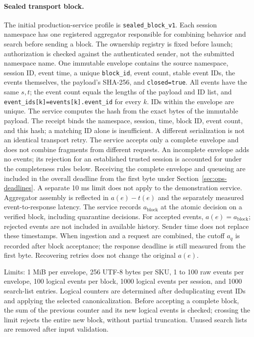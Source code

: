 \documentclass[12pt,a4paper]{article}
\newcommand{\code}[1]{{\ttfamily\small\nolinkurl{#1}}}
\theoremstyle{plainru}
\begin{document}
\paragraph{Sealed transport block.}\label{sec:ops-transport-block}
The initial production-service profile is \code{sealed_block_v1}.
Each session namespace has one registered
aggregator responsible for combining behavior and search before sending a block.
The ownership registry is fixed before launch; authorization is checked against
the authenticated sender, not the submitted namespace name.
One immutable envelope contains the source namespace, session ID,
event time, a unique \code{block_id}, event count, stable event
IDs, the events themselves, the payload's SHA-256, and \code{closed=true}.
All events have the same $s,t$; the event count equals the lengths of the payload
and ID list, and \code{event_ids[k]=events[k].event_id} for every $k$.
IDs within the envelope are unique. The service computes the hash from the exact bytes of the immutable
payload. The receipt binds the namespace, session, time, block ID,
event count, and this hash; a matching ID alone is insufficient.
A different serialization is not an identical transport retry.
The service accepts only a complete envelope and does not combine fragments
from different requests. An incomplete envelope adds no events;
its rejection for an established trusted session is accounted for
under the completeness rules below.
Receiving the complete envelope and queueing are included in the overall deadline from the first
byte under Section~\ref{sec:ops-deadlines}. A separate 10 ms limit
does not apply to the demonstration service. Aggregator assembly is reflected
in $a(e)-t(e)$ and the separately measured event-to-response latency.
The service records $a_{\mathrm{block}}$ at the atomic decision on a verified
block, including quarantine decisions. For accepted events, $a(e)=a_{\mathrm{block}}$;
rejected events are not included in available history.
Sender time does not replace these timestamps.
When ingestion and a request are combined, the cutoff $a_q$
is recorded after block acceptance; the response deadline is still measured
from the first byte. Recovering retries does not change the original $a(e)$.

Limits: 1 MiB per envelope, 256 UTF-8 bytes per SKU,
1 to 100 raw events per envelope, 100 logical events per block,
1000 logical events per session, and 1000 search-list entries.
Logical counters are determined after deduplicating event IDs
and applying the selected canonicalization. Before accepting a complete block,
the sum of the previous counter and its new logical events is checked; crossing
the limit rejects the entire new block, without partial truncation.
Unused search lists are removed after input validation.
\end{document}
